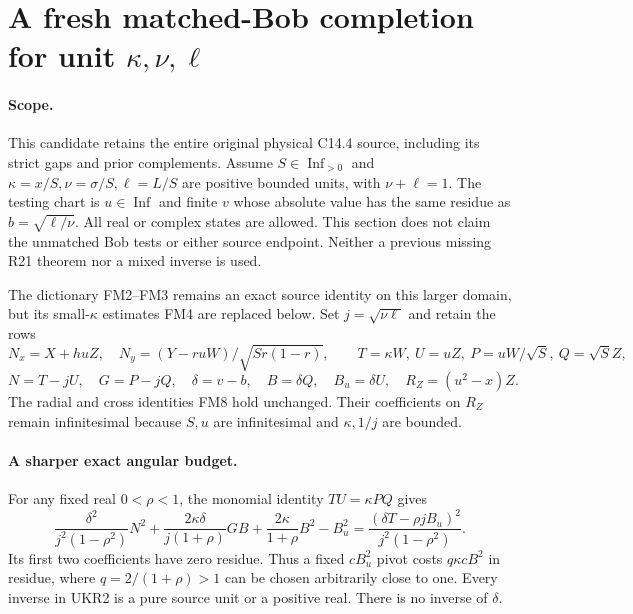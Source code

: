 \section{A fresh matched-Bob completion for unit $\kappa,\nu,\ell$}
\label{sec:new-c144-unit-kappa-matched}

\paragraph{Scope.}
This candidate retains the entire original physical C14.4 source,
including its strict gaps and prior complements. Assume
$S\in\operatorname{Inf}_{>0}$ and $\kappa=x/S,\nu=\sigma/S,
\ell=L/S$ are positive bounded units, with $\nu+\ell=1$.
The testing chart is $u\in\operatorname{Inf}$ and finite $v$
whose absolute value has the same residue as
$b=\sqrt{\ell/\nu}$. All real or complex states are allowed.
This section does not claim the unmatched Bob tests or either
source endpoint. Neither a previous missing R21 theorem nor a
mixed inverse is used.

The dictionary FM2--FM3 remains an exact source identity on this
larger domain, but its small-$\kappa$ estimates FM4 are replaced
below. Set $j=\sqrt{\nu\ell}$ and retain the rows
\[
 N_x=X+huZ,\quad N_y=(Y-ruW)/\sqrt{Sr(1-r)},\qquad
 T=\kappa W,\ U=uZ,\ P=uW/\sqrt S,\ Q=\sqrt S Z,
\]
\[
 N=T-jU,\quad G=P-jQ,\quad \delta=v-b,\quad
 B=\delta Q,\quad B_u=\delta U,\quad R_Z=(u^2-x)Z.
 \tag{UKR1}
\]
The radial and cross identities FM8 hold unchanged. Their
coefficients on $R_Z$ remain infinitesimal because $S,u$ are
infinitesimal and $\kappa,1/j$ are bounded.

\paragraph{A sharper exact angular budget.}
For any fixed real $0<\rho<1$, the monomial identity $TU=\kappa PQ$
gives
\[
 \frac{\delta^2}{j^2(1-\rho^2)}N^2+
 \frac{2\kappa\delta}{j(1+\rho)}GB+
 \frac{2\kappa}{1+\rho}B^2-B_u^2
   =\frac{(\delta T-\rho jB_u)^2}{j^2(1-\rho^2)}.
 \tag{UKR2}
\]
Its first two coefficients have zero residue. Thus a fixed
$cB_u^2$ pivot costs $q\kappa cB^2$ in residue, where
$q=2/(1+\rho)>1$ can be chosen arbitrarily close to one.
Every inverse in UKR2 is a pure source unit or a positive real.
There is no inverse of $\delta$.

